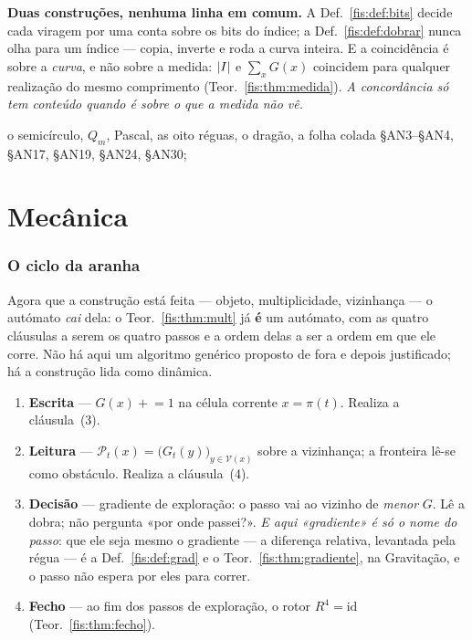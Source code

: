 \documentclass[livro.tex]{subfiles}
\begin{document}
\medskip\noindent\textbf{Duas construções, nenhuma linha em comum.} A
Def.~\ref{fis:def:bits} decide cada viragem por uma conta sobre os bits do
índice; a Def.~\ref{fis:def:dobrar} nunca olha para um índice --- copia, inverte
e roda a curva inteira. E a coincidência é sobre a \emph{curva}, e não sobre a
medida: $\lvert I\rvert$ e $\sum_x G(x)$ coincidem para qualquer realização do mesmo
comprimento (Teor.~\ref{fis:thm:medida}). \emph{A concordância só tem conteúdo
quando é sobre o que a medida não vê.}



        {o semicírculo, $Q_m$, Pascal, as oito réguas, o dragão, a folha colada}
        { §AN3--§AN4, §AN17, §AN19, §AN24, §AN30; }

\part{Mecânica}

\section{O ciclo da aranha}\label{fis:algoritmo}

\noindent Agora que a construção está feita --- objeto, multiplicidade,
vizinhança --- o autómato \emph{cai} dela: o Teor.~\ref{fis:thm:mult} já
\textbf{é} um autómato, com as quatro cláusulas a serem os quatro passos e a
ordem delas a ser a ordem em que ele corre. Não há aqui um algoritmo genérico
proposto de fora e depois justificado; há a construção lida como dinâmica.

\begin{enumerate}\itemsep3pt
\item[1.] \textbf{Escrita} --- $G(x)\mathrel{+}=1$ na célula corrente
$x=\pi(t)$. Realiza a cláusula~(3).
\item[2.] \textbf{Leitura} --- $\mathcal{P}_{t}(x)=\bigl(G_t(y)\bigr)_{y\in
\mathcal{V}(x)}$ sobre a vizinhança; a fronteira lê-se como obstáculo. Realiza a
cláusula~(4).
\item[3.] \textbf{Decisão} --- gradiente de exploração: o passo vai ao vizinho de
\emph{menor} $G$. Lê a dobra; não pergunta «por onde passei?». \emph{E aqui
«gradiente» é só o nome do passo}: que ele seja mesmo o gradiente --- a diferença
relativa, levantada pela régua --- é a Def.~\ref{fis:def:grad} e o
Teor.~\ref{fis:thm:gradiente}, na Gravitação, e o passo não espera por eles para
correr.
\item[4.] \textbf{Fecho} --- ao fim dos passos de exploração, o rotor
$R^{4}=\mathrm{id}$ (Teor.~\ref{fis:thm:fecho}).
\end{enumerate}
\end{document}
